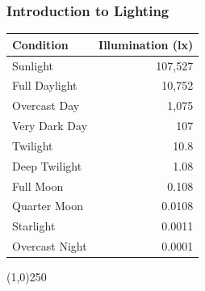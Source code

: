 \begin{frame}
\frametitle{Introduction to Lighting}
	\begin{table}
		\centering
			\begin{tabular}{|l|r|}
				\hline
				Condition 			& Illumination (lx)\\
				\hline
				Sunlight 				&	107,527\\
				Full Daylight 	&	10,752\\
				Overcast Day 		&	1,075\\
				Very Dark Day 	&	107\\
				Twilight 				&	10.8\\
				Deep Twilight 	&	1.08\\
				Full Moon 			&	0.108\\
				Quarter Moon 		&	0.0108\\
				Starlight 			&	0.0011\\
				Overcast Night 	&	0.0001\\
				\hline
			\end{tabular}
	\end{table}
\end{frame}
\begin{center}\line(1,0){250}\end{center}








